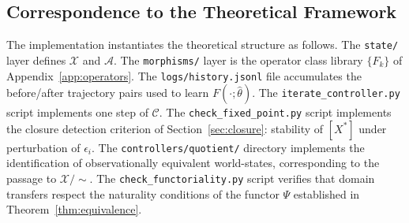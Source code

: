 \documentclass[12pt, oneside]{article}
\newcommand{\Xmod}{\mathcal{X}/{\sim}}
\begin{document}
\subsection{Correspondence to the Theoretical Framework}

The implementation instantiates the theoretical structure as follows. The
\texttt{state/} layer defines $\mathcal{X}$ and $\mathcal{A}$. The
\texttt{morphisms/} layer is the operator class library $\{F_k\}$ of
Appendix~\ref{app:operators}. The \texttt{logs/history.jsonl} file accumulates the
before/after trajectory pairs used to learn $F(\cdot;\hat{\theta})$. The
\texttt{iterate\_controller.py} script implements one step of $\mathcal{C}$.
The \texttt{check\_fixed\_point.py} script implements the closure detection criterion
of Section~\ref{sec:closure}: stability of $[X^*]$ under perturbation of $\epsilon_i$.
The \texttt{controllers/quotient/} directory implements the identification of
observationally equivalent world-states, corresponding to the passage to $\Xmod$.
The \texttt{check\_functoriality.py} script verifies that domain transfers respect
the naturality conditions of the functor $\Psi$ established in
Theorem~\ref{thm:equivalence}.
\end{document}
